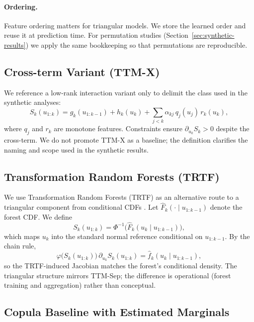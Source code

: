 \documentclass[11pt,a4paper,twoside]{book}\usepackage[]{graphicx}\usepackage[]{xcolor}
\begin{document}
\paragraph{Ordering.} Feature ordering matters for triangular models. We store the learned order and reuse it at prediction time. For permutation studies (Section~\ref{sec:synthetic-results}) we apply the same bookkeeping so that permutations are reproducible.

\subsection{Cross-term Variant (TTM-X)}

We reference a low-rank interaction variant only to delimit the class used in the synthetic analyses:
\begin{equation}
  S_k(u_{1:k}) = g_k(u_{1:k-1}) + h_k(u_k) + \sum_{j<k} \alpha_{kj} \, q_j(u_j) \, r_k(u_k),
  \label{eq:ttm-cross}
\end{equation}
where $q_j$ and $r_k$ are monotone features. Constraints ensure $\partial_{u_k} S_k > 0$ despite the cross-term. We do not promote TTM-X as a baseline; the definition clarifies the naming and scope used in the synthetic results.

\subsection{Transformation Random Forests (TRTF)}

We use Transformation Random Forests (TRTF) as an alternative route to a triangular component from conditional CDFs \citep{hothorn2017transformation,hothorn2018conditional}. Let $\widehat{F}_k(\cdot \mid u_{1:k-1})$ denote the forest CDF. We define
\begin{equation}
  S_k(u_{1:k}) = \Phi^{-1}\!\big(\widehat{F}_k(u_k \mid u_{1:k-1})\big),
  \label{eq:trtf-transport}
\end{equation}
which maps $u_k$ into the standard normal reference conditional on $u_{1:k-1}$. By the chain rule,
\[
  \varphi\big(S_k(u_{1:k})\big)\, \partial_{u_k} S_k(u_{1:k}) = \widehat{f}_k(u_k \mid u_{1:k-1}),
\]
so the TRTF-induced Jacobian matches the forest’s conditional density. The triangular structure mirrors TTM-Sep; the difference is operational (forest training and aggregation) rather than conceptual.

\subsection{Copula Baseline with Estimated Marginals}
\end{document}
